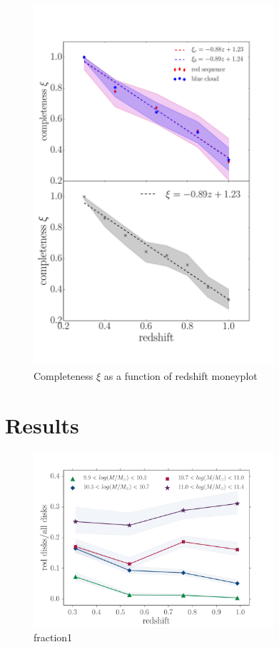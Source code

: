 \documentclass[useAMS,usenatbib]{mn2e}
\begin{document}
\begin{figure}
\centering
\includegraphics[width=3.5in,trim={0cm 0cm 1cm 1cm},clip]{figures/completenessmoneyplot.pdf}
\caption{Completeness $\xi$ as a function of redshift moneyplot}
\label{fig:notlinear}
\end{figure}

\section{Results}
\label{sec:Results}

\begin{figure}
\centering
\includegraphics[width=3.5in,trim={0cm 0cm 1cm 1cm},clip]{figures/red_disk_fraction1.pdf}
\caption{fraction1}
\label{fig:f1}
\end{figure}
\end{document}
